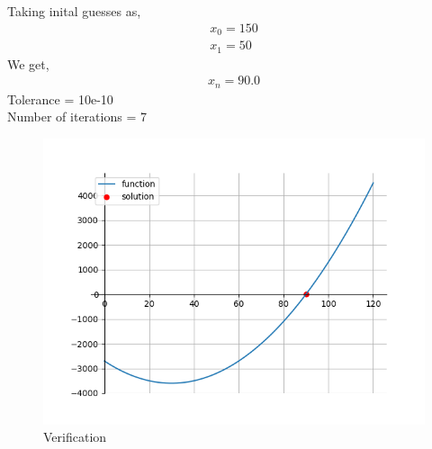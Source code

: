 \documentclass[journal]{IEEEtran}
\begin{document}
    Taking inital guesses as,
    \begin{align}
        x_0 = 150\\
        x_1 = 50
    \end{align}
    We get,
    \begin{align}
        x_n = 90.0
    \end{align}
    Tolerance = 10e-10\\
    Number of iterations = 7

    \begin{figure}[ht]  
        \centering  
        \includegraphics[width=\columnwidth]{figs/fig1.png}  
        \caption{Verification}
    \end{figure}
\end{document}

